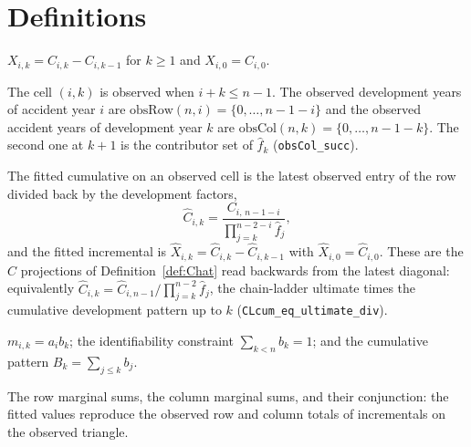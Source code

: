 \section{Definitions}

\begin{definition}\label{def:incr}\leanok
$X_{i,k} = C_{i,k} - C_{i,k-1}$ for $k \ge 1$ and $X_{i,0} = C_{i,0}$.
\end{definition}

\begin{definition}\label{def:obs}\leanok
The cell $(i,k)$ is observed when $i + k \le n-1$. The observed development years of
accident year $i$ are $\mathrm{obsRow}(n,i) = \{0,\dots,n-1-i\}$ and the observed
accident years of development year $k$ are $\mathrm{obsCol}(n,k) = \{0,\dots,n-1-k\}$.
The second one at $k+1$ is the contributor set of $\hat f_k$
(\texttt{obsCol\_succ}).
\end{definition}

\begin{definition}\label{def:CLfit}\leanok
{}
The fitted cumulative on an observed cell is the latest observed entry of the row
divided back by the development factors,
\[
  \hat C_{i,k} = \frac{C_{i,\,n-1-i}}{\prod_{j=k}^{n-2-i} \hat f_j},
\]
and the fitted incremental is $\hat X_{i,k} = \hat C_{i,k} - \hat C_{i,k-1}$ with
$\hat X_{i,0} = \hat C_{i,0}$. These are the $\hat C$ projections of
Definition~\ref{def:Chat} read backwards from the latest diagonal: equivalently
$\hat C_{i,k} = \hat C_{i,n-1} / \prod_{j=k}^{n-2}\hat f_j$, the chain-ladder ultimate
times the cumulative development pattern up to $k$
(\texttt{CLcum\_eq\_ultimate\_div}).
\end{definition}

\begin{definition}\label{def:mult}\leanok
$m_{i,k} = a_i b_k$; the identifiability constraint $\sum_{k<n} b_k = 1$; and the
cumulative pattern $B_k = \sum_{j \le k} b_j$.
\end{definition}

\begin{definition}\label{def:score}\leanok
{}
The row marginal sums, the column marginal sums, and their conjunction: the fitted
values reproduce the observed row and column totals of incrementals on the observed
triangle.
\end{definition}

